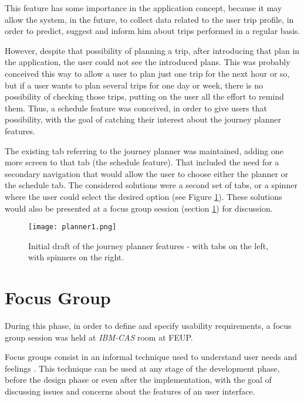 This feature has some importance in the application concept, because it may allow the system, in the future, to collect data related to the user trip profile, in order to predict, suggest and inform him about trips performed in a regular basis.

However, despite that possibility of planning a trip, after introducing that plan in the application, the user could not see the introduced plans. This was probably conceived this way to allow a user to plan just one trip for the next hour or so, but if a user wants to plan several trips for one day or week, there is no possibility of checking those trips, putting on the user all the effort to remind them.
Thus, a schedule feature was conceived, in order to give users that possibility, with the goal of catching their interest about the journey planner features.

The existing tab referring to the journey planner was maintained, adding one more screen to that tab (the schedule feature). That included the need for a secondary navigation that would allow the user to choose either the planner or the schedule tab. The considered solutions were a second set of tabs, or a spinner where the user could select the desired option (see Figure \ref{fig:planner1}). These solutions would also be presented at a focus group session (section \ref{focusgroup}) for discussion.

\begin{figure}[h!]
  \begin{center}
    \leavevmode
    \texttt{[image: planner1.png]}
    \caption{Initial draft of the journey planner features - with tabs on the left, with spinners on the right.}
    \label{fig:planner1}
  \end{center}
\end{figure}

\section{Focus Group}\label{focusgroup}

During this phase, in order to define and specify usability requirements, a focus group session was held at \emph{IBM-CAS} room at FEUP.

Focus groups consist in an informal technique used to understand user needs and feelings \cite{kn:KC08}. This technique can be used at any stage of the development phase, before the design phase or even after the implementation, with the goal of discussing issues and concerns about the features of an user interface. 

